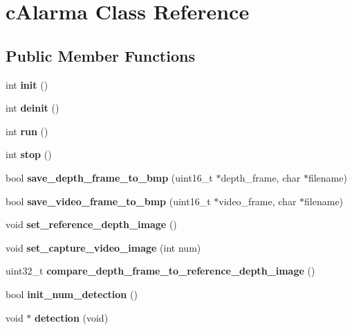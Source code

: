 \hypertarget{classc_alarma}{}\section{c\+Alarma Class Reference}
\label{classc_alarma}
\subsection*{Public Member Functions}
\begin{DoxyCompactItemize}
\item 
\mbox{\label{classc_alarma_ab7288267f9fb833e4705b75a6962f20a}} 
int {\bfseries init} ()
\item 
\mbox{\label{classc_alarma_a5210483cbe536bfac5d0284368a4152c}} 
int {\bfseries deinit} ()
\item 
\mbox{\label{classc_alarma_a0725cfe2ca0fc5c244e10057ce265660}} 
int {\bfseries run} ()
\item 
\mbox{\label{classc_alarma_a5e4b0dbd1e6ff95d36ffba9d1cb2d523}} 
int {\bfseries stop} ()
\item 
\mbox{\label{classc_alarma_aa51980b8c13c3460f2016dc9b5cd7978}} 
bool {\bfseries save\+\_\+depth\+\_\+frame\+\_\+to\+\_\+bmp} (uint16\+\_\+t $\ast$depth\+\_\+frame, char $\ast$filename)
\item 
\mbox{\label{classc_alarma_ab09a5047ed2125ade700922b97e3d4ce}} 
bool {\bfseries save\+\_\+video\+\_\+frame\+\_\+to\+\_\+bmp} (uint16\+\_\+t $\ast$video\+\_\+frame, char $\ast$filename)
\item 
\mbox{\label{classc_alarma_a06749c25e32a54e79cfb778fd1f759bc}} 
void {\bfseries set\+\_\+reference\+\_\+depth\+\_\+image} ()
\item 
\mbox{\label{classc_alarma_a35d13dce251a96a1e09d4463d1e4801c}} 
void {\bfseries set\+\_\+capture\+\_\+video\+\_\+image} (int num)
\item 
\mbox{\label{classc_alarma_a3bf8997620ac7c9bf99207bc974dd01f}} 
uint32\+\_\+t {\bfseries compare\+\_\+depth\+\_\+frame\+\_\+to\+\_\+reference\+\_\+depth\+\_\+image} ()
\item 
\mbox{\label{classc_alarma_ad56ae6840cc8978a774f99f0e18d4048}} 
bool {\bfseries init\+\_\+num\+\_\+detection} ()
\item 
\mbox{\label{classc_alarma_a2ffecbfd630a6ed364bf6560f9e11750}} 
void $\ast$ {\bfseries detection} (void)
\end{DoxyCompactItemize}
